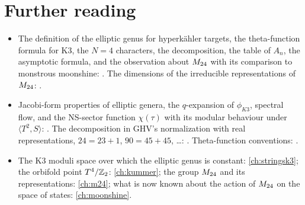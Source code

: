 \section*{Further reading}
\begin{itemize}[leftmargin=1.5em]
\item The definition of the elliptic genus for hyperk\"ahler targets, the theta-function
 formula for K3, the $N=4$ characters, the decomposition, the table of $A_n$, the
 asymptotic formula, and the observation about $M_{24}$ with its comparison to monstrous
 moonshine: . The dimensions of the irreducible representations
 of $M_{24}$: .
\item Jacobi-form properties of elliptic genera, the $q$-expansion of $\phi_{K3}$, spectral
 flow, and the NS-sector function $\chi(\tau)$ with its modular behaviour under
 $\langle T^2,S\rangle$: . The decomposition in GHV's
 normalization with real representations, $24=23+1$, $90=45+45$, \dots:
 . Theta-function conventions:
 .
\item The K3 moduli space over which the elliptic genus is constant: \cref{ch:stringsk3};
 the orbifold point $T^4/\mathbb{Z}_2$: \cref{ch:kummer}; the group $M_{24}$ and its representations:
 \cref{ch:m24}; what is now known about the action of $M_{24}$ on the space of states:
 \cref{ch:moonshine}.
\end{itemize}
